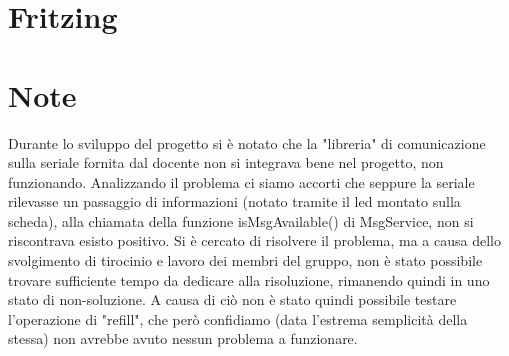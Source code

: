 \documentclass{article}
\begin{document}
\section{Fritzing}
\hfill
\begin{center}
\end{center}

\newpage


\section{Note}
Durante lo sviluppo del progetto si è notato che la "libreria" di comunicazione sulla seriale fornita dal docente non si integrava bene nel progetto, non funzionando. Analizzando il problema ci siamo accorti che seppure la seriale rilevasse un passaggio di informazioni (notato tramite il led montato sulla scheda), alla chiamata della funzione isMsgAvailable() di MsgService, non si riscontrava esisto positivo. Si è cercato di risolvere il problema, ma a causa dello svolgimento di tirocinio e lavoro dei membri del gruppo, non è stato possibile trovare sufficiente tempo da dedicare alla risoluzione, rimanendo quindi in uno stato di non-soluzione. A causa di ciò non è stato quindi possibile testare l'operazione di "refill", che però confidiamo (data l'estrema semplicità della stessa) non avrebbe avuto nessun problema a funzionare.

\end{document}
